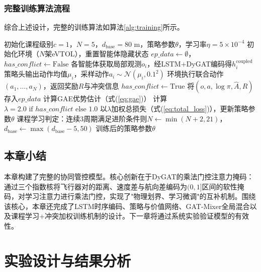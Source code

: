 \documentclass[12pt,a4paper,UTF8]{ctexbook}
\begin{document}
\subsection{完整训练算法流程}

综合上述设计，完整的训练算法如算法\ref{alg:training}所示。

\begin{algorithm}[H]
\caption{基于DyGAT-MARL的协同管控模型训练流程}
\label{alg:training}
\begin{algorithmic}[1]
\STATE 初始化课程级别$c=1$，$N=5$，$d_{\text{base}}=80$ m，策略参数$\theta$，学习率$\eta=5\times10^{-4}$
    \STATE 初始化环境（$N$架eVTOL），重置智能体隐藏状态
    \STATE $ep\_data \leftarrow \emptyset$，$has\_conflict \leftarrow \text{False}$
    \REPEAT
        \STATE 各智能体获取局部观测$o_i$，经LSTM+DyGAT编码得$h_i^{\text{coupled}}$
        \STATE 策略头输出动作均值$\mu_i$，采样动作$a_i\sim\mathcal{N}(\mu_i,0.1^2)$
        \STATE 环境执行联合动作$(a_1,\ldots,a_N)$，返回奖励$R$与冲突信息
         \STATE $has\_conflict \leftarrow \text{True}$ \ENDIF
        \STATE 将$(o,a,\log\pi,\hat{A},R)$存入$ep\_data$
    \STATE 计算GAE优势估计（式(\ref{eq:gae})）
    \STATE 计算$\lambda = 2.0 \text{ if } has\_conflict \text{ else } 1.0$
    \STATE 以$\lambda$加权总损失（式(\ref{eq:total_loss})），更新策略参数$\theta$
    \STATE 课程学习判定：连续3周期满足进阶条件则$N\leftarrow\min(N+2,21)$，$d_{\text{base}}\leftarrow\max(d_{\text{base}}-5,50)$
\ENDFOR
\STATE \RETURN 训练后的策略参数$\theta$
\end{algorithmic}
\end{algorithm}

\section{本章小结}

本章构建了完整的协同管控模型。核心创新在于DyGAT的乘法门控注意力掩码：通过三个指数核将飞行器对的距离、速度差与航向差编码为$(0,1]$区间的软性掩码，对学习注意力进行乘法门控，实现了"物理划界、学习微调"的互补机制。围绕该核心，本章还完成了LSTM时序编码、策略与价值网络、GAT-Mixer全局混合以及课程学习+冲突加权训练机制的设计。下一章将通过系统实验验证模型的有效性。

\chapter{实验设计与结果分析}
\end{document}
